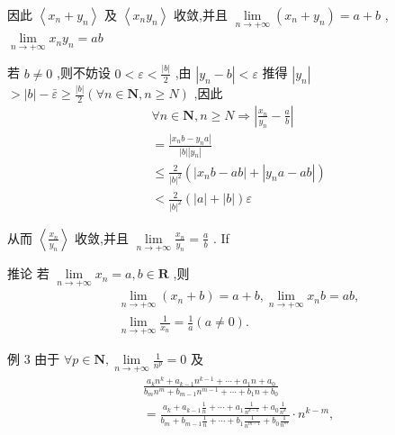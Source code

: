 因此 $\left\langle  {{x}_{n} + {y}_{n}}\right\rangle$ 及 $\left\langle  {{x}_{n}{y}_{n}}\right\rangle$ 收敛,并且 $\mathop{\lim }\limits_{{n \rightarrow   + \infty }}\left( {{x}_{n} + {y}_{n}}\right)  = a + b$ , $\mathop{\lim }\limits_{{n \rightarrow   + \infty }}{x}_{n}{y}_{n} = {ab}$

若 $b \neq  0$ ,则不妨设 $0 < \varepsilon  < \frac{\left| b\right| }{2}$ ,由 $\left| {{y}_{n} - b}\right|  < \varepsilon$ 推得 $\left| {y}_{n}\right|$  $> \left| b\right|  - \bar{\varepsilon } \geq  \frac{\left| b\right| }{2}\left( {\forall n \in  \mathbf{N},n \geq  N}\right)$ ,因此
\begin{align*}
	&\forall n \in  \mathbf{N},n \geq  N \Rightarrow  \left| {\frac{{x}_{n}}{{y}_{n}} - \frac{a}{b}}\right|\\
	&= \frac{\left| {x}_{n}b - {y}_{n}a\right| }{\left| b\right| \left| {y}_{n}\right| }\\
	&\leq  \frac{2}{{\left| b\right| }^{2}}\left( {\left| {{x}_{n}b - {ab}}\right|  + \left| {{y}_{n}a - {ab}}\right| }\right)\\
	&< \frac{2}{{\left| b\right| }^{2}}\left( {\left| a\right|  + \left| b\right| }\right) \varepsilon
\end{align*}

从而 $\left\langle  \frac{{x}_{n}}{{y}_{n}}\right\rangle$ 收敛,并且 $\mathop{\lim }\limits_{{n \rightarrow   + \infty }}\frac{{x}_{n}}{{y}_{n}} = \frac{a}{b}$ . If

推论 若 $\mathop{\lim }\limits_{{n \rightarrow   + \infty }}{x}_{n} = a,b \in  \mathbf{R}$ ,则
\begin{align*}
	&\mathop{\lim }\limits_{{n \rightarrow   + \infty }}\left( {{x}_{n} + b}\right)  = a + b,\mathop{\lim }\limits_{{n \rightarrow   + \infty }}{x}_{n}b = {ab},\\
	&\mathop{\lim }\limits_{{n \rightarrow   + \infty }}\frac{1}{{x}_{n}} = \frac{1}{a}\left( {a \neq  0}\right) .
\end{align*}

例 3 由于 $\forall p \in  \mathbf{N},\mathop{\lim }\limits_{{n \rightarrow   + \infty }}\frac{1}{{n}^{p}} = 0$ 及
\begin{align*}
	&\frac{{a}_{k}{n}^{k} + {a}_{k - 1}{n}^{k - 1} + \cdots  + {a}_{1}n + {a}_{0}}{{b}_{m}{n}^{m} + {b}_{m - 1}{n}^{m - 1} + \cdots  + {b}_{1}n + {b}_{0}}\\
	&= \frac{{a}_{k} + {a}_{k - 1}\frac{1}{n} + \cdots  + {a}_{1}\frac{1}{{n}^{k - 1}} + {a}_{0}\frac{1}{{n}^{k}}}{{b}_{m} + {b}_{m - 1}\frac{1}{n} + \cdots  + {b}_{1}\frac{1}{{n}^{m - 1}} + {b}_{0}\frac{1}{{n}^{m}}} \cdot  {n}^{k - m},
\end{align*}

